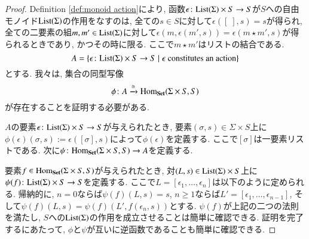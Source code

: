 \begin{proof}


Definition \ref{def:monoid action}により, 函数$\epsilon\taking\List(\Sigma)\times S\to S$が$S$への自由モノイド$\List(\Sigma)$の作用をなすのは, 全ての$s\in S$に対して$\epsilon([\;],s)=s$が得られ, 全ての二要素の組$m,m'\in\List(\Sigma)$に対して$\epsilon(m,\epsilon(m',s))=\epsilon(m\star m',s)$が得られるときであり, かつその時に限る. ここで$m\star m'$はリストの結合である. $$A=\{\epsilon\taking \List(\Sigma)\times S\to S\|\epsilon\tn{ constitutes an action}\}$$とする. 我々は, 集合の同型写像$$\phi\taking A\To{\iso}\Hom_\Set(\Sigma\times S,S)$$が存在することを証明する必要がある.


$A$の要素$\epsilon\taking\List(\Sigma)\times S\to S$が与えられたとき, 要素$(\sigma,s)\in\Sigma\times S$上に$\phi(\epsilon)(\sigma,s):=\epsilon([\sigma],s)$によって$\phi(\epsilon)$を定義する. ここで$[\sigma]$は一要素リストである. 次に$\psi\taking\Hom_\Set(\Sigma\times S,S)\to A$を定義する.


要素$f\in\Hom_\Set(\Sigma\times S,S)$が与えられたとき, 対$(L,s)\in\List(\Sigma)\times S$上に$\psi(f)\taking\List(\Sigma)\times S\to S$を定義する. ここで$L=[\epsilon_1,\ldots,\epsilon_n]$は以下のように定められる. 帰納的に, $n=0$ならば$\psi(f)(L,s)=s$, $n\geq 1$ならば$L'=[\epsilon_1,\ldots,\epsilon_{n-1}]$, そして$\psi(f)(L,s)=\psi(f)(L',f(\epsilon_n,s))$とする. $\psi(f)$が上記の二つの法則を満たし, $S$への$\List(\Sigma)$の作用を成立させることは簡単に確認できる. 証明を完了するにあたって, $\phi$と$\psi$が互いに逆函数であることも簡単に確認できる.

\end{proof}

